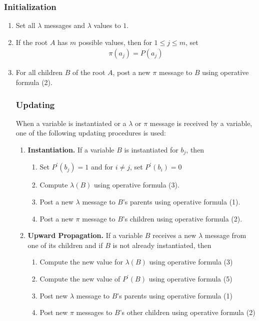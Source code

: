 \documentclass[12pt,twoside]{article}
\begin{document}
\subsubsection{Initialization}
\begin{enumerate}
	\item Set all $\lambda$ messages and $\lambda$ values to $1$.
	\item If the root $A$ has $m$ possible values, then for $1 \leq j \leq m$, set
		\begin{align*}
			\pi(a_j) = P(a_j)
		\end{align*}
	\item For all children $B$ of the root $A$, post a new $\pi$ message to $B$ using operative formula (2).
	
	
\subsubsection{Updating}
 When a variable is instantiated or a $\lambda$ or $\pi$ message is received by a variable, one of the following updating procedures is used:
 
 \begin{enumerate}
\item \textbf{Instantiation.} If a variable $B$ is instantiated for $b_j$, then
	\begin{enumerate}
		\item Set $P^\prime (b_j)=1$ and for $i \neq j$, set $P^\prime(b_i)=0$
		\item Compute $\lambda (B)$ using operative formula (3).
		\item Post a new $\lambda$ message to $B$'s parents using operative formula (1).
		\item Post a new $\pi$ message to $B$'s children using operative formula (2).
	\end{enumerate}
	

\item \textbf{Upward Propagation.} If a variable $B$ receives a new $\lambda$ message from one of its children and if $B$ is not already instantiated, then
	\begin{enumerate}
		\item Compute the new value for $\lambda (B)$ using operative formula (3)
		\item Compute the new value of $P^\prime(B)$ using operative formula (5)
		\item Post new $\lambda$ message to $B$'s parents using operative formula (1)
		\item Post new $\pi$ messages to $B$'s other children using operative formula (2)
	\end{enumerate}



\end{enumerate}
\end{enumerate}
\end{document}
